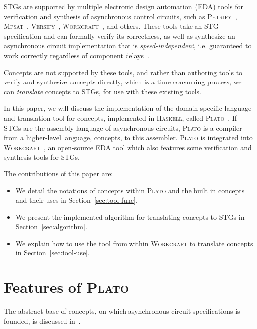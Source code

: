 \documentclass[british,conference,compsoc]{IEEEtran}
\newcommand{\noun}[1]{\textsc{#1}}
\begin{document}
STGs are supported by multiple electronic design automation~(EDA) tools for verification and synthesis 
of asynchronous control circuits,
such as \noun{Petrify}~\cite{Cortadella}, \noun{Mpsat}~\cite{khomenko2004detecting}, 
\noun{Versify}~\cite{i1997formal}, 
\noun{Workcraft}~\cite{2007_poliakov_workcraft}\cite{Workcraft_website}, 
and others. These tools take an STG specification and can formally verify its correctness, 
as well as synthesize an asynchronous circuit implementation that is 
\emph{speed-independent}, i.e. guaranteed to work correctly regardless of 
component delays~\cite{Muller_1959_ts}.

Concepts are not supported by these tools, and rather than
authoring tools to verify and synthesize concepts directly, which is a time 
consuming process, we can \emph{translate} concepts to STGs, for use with these
existing tools.

In this paper, we will discuss the implementation of the domain specific 
language and translation tool for concepts, implemented in \noun{Haskell}, called 
\noun{Plato}~\cite{2016_concepts_github}.
If STGs are the assembly language of asynchronous circuits, \noun{Plato} is a 
compiler from a higher-level language, concepts, to this assembler. \noun{Plato} is 
integrated into \noun{Workcraft}~\cite{Workcraft_website}, an open-source 
EDA tool which also features some verification and synthesis tools for STGs.

The contributions of this paper are:
\vspace{-1mm}
\begin{itemize}
  \item We detail the notations of concepts within \noun{Plato} and the built in
  concepts and their uses in Section~\ref{sec:tool-func}.
  \item We present the implemented algorithm for translating concepts to STGs
  in Section~\ref{sec:algorithm}.
  \item We explain how to use the tool from within
  \noun{Workcraft} to translate concepts in Section~\ref{sec:tool-use}.
\end{itemize}

\section{Features of \noun{Plato}\label{sec:tool-func}}

\vspace{-3mm}

The abstract base of concepts, on which asynchronous circuit specifications 
is founded, is discussed in~\cite{2015_Beaumont_MEMOCODE}.
\end{document}
